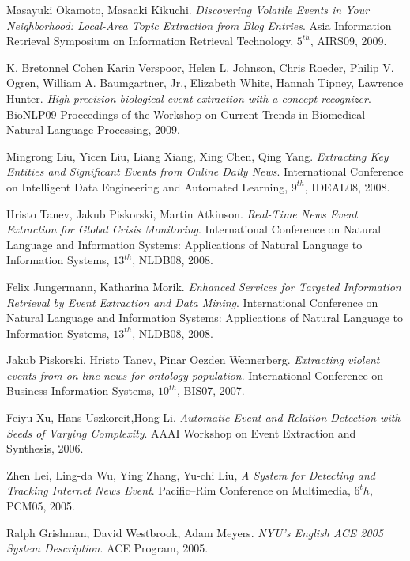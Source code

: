 \begin{thebibliography}{99}
		 	Masayuki Okamoto, Masaaki Kikuchi. \emph{Discovering Volatile Events in Your Neighborhood: Local-Area Topic Extraction from Blog Entries}. Asia Information Retrieval Symposium on Information Retrieval Technology, $5^{th}$, AIRS09, 2009.

		 K. Bretonnel Cohen 	
	Karin Verspoor, 
	Helen L. Johnson, 
	Chris Roeder, 	
	Philip V. Ogren, 	
	William A. Baumgartner, Jr.,
	Elizabeth White, 	
	Hannah Tipney, 	
	Lawrence Hunter.	 \emph{High-precision biological event extraction with a concept recognizer}. BioNLP09 Proceedings of the Workshop on Current Trends in Biomedical Natural Language Processing, 2009.
	

		 	Mingrong Liu, Yicen Liu, Liang Xiang, Xing Chen, Qing Yang. \emph{Extracting Key Entities and Significant Events from Online Daily News}. International Conference on Intelligent Data Engineering and Automated Learning, $9^{th}$, IDEAL08, 2008. 	

		 	Hristo Tanev, Jakub Piskorski, Martin Atkinson. \emph{Real-Time News Event Extraction for Global Crisis Monitoring}. International Conference on Natural Language and Information Systems: Applications of Natural Language to Information Systems, $13^{th}$, NLDB08, 2008.

		  Felix Jungermann, Katharina Morik.  \emph{Enhanced Services for Targeted Information Retrieval by Event Extraction and Data Mining}. International Conference on Natural Language and Information Systems: Applications of Natural Language to Information Systems, $13^{th}$, NLDB08, 2008. 

		  	Jakub Piskorski, Hristo Tanev, Pinar Oezden Wennerberg. \emph{Extracting violent events from on-line news for ontology population}.  International Conference on Business Information Systems, $10^{th}$, BIS07, 2007. 

		 Feiyu Xu, Hans Uszkoreit,Hong Li. \emph{Automatic Event and Relation Detection
with Seeds of Varying Complexity}. AAAI Workshop on Event Extraction and Synthesis, 2006.
		
		 Zhen Lei, Ling-da Wu, Ying Zhang, Yu-chi Liu, \emph{A System for Detecting and Tracking Internet News Event}. Pacific--Rim Conference on Multimedia, $6^th$, PCM05, 2005.

		 Ralph Grishman, David Westbrook, Adam Meyers. \emph{NYU's English ACE 2005 System Description}. ACE Program, 2005. 



\end{thebibliography}
